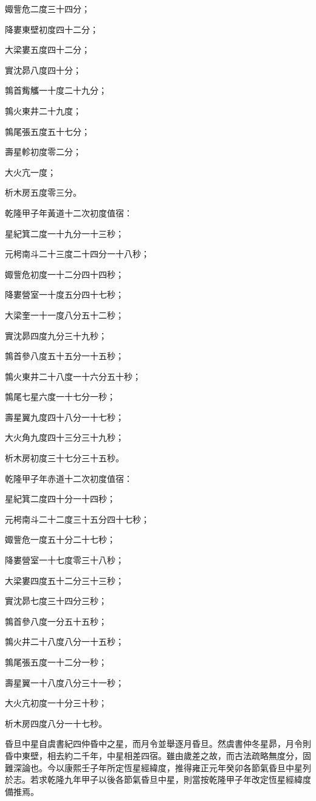 \begin{pinyinscope}
娵訾危二度三十四分；

降婁東壁初度四十二分；

大梁婁五度四十二分；

實沈昴八度四十分；

鶉首觜觿一十度二十九分；

鶉火東井二十九度；

鶉尾張五度五十七分；

壽星軫初度零二分；

大火亢一度；

析木房五度零三分。

乾隆甲子年黃道十二次初度值宿：

星紀箕二度一十九分一十三秒；

元枵南斗二十三度二十四分一十八秒；

娵訾危初度一十二分四十四秒；

降婁營室一十度五分四十七秒；

大梁奎一十一度八分五十二秒；

實沈昴四度九分三十九秒；

鶉首參八度五十五分一十五秒；

鶉火東井二十八度一十六分五十秒；

鶉尾七星六度一十七分一秒；

壽星翼九度四十八分一十七秒；

大火角九度四十三分三十九秒；

析木房初度三十七分三十五秒。

乾隆甲子年赤道十二次初度值宿：

星紀箕二度四十分一十四秒；

元枵南斗二十二度三十五分四十七秒；

娵訾危一度五十分二十七秒；

降婁營室一十七度零三十八秒；

大梁婁四度五十二分三十三秒；

實沈昴七度三十四分三秒；

鶉首參八度一分五十五秒；

鶉火井二十八度八分一十五秒；

鶉尾張五度一十二分一秒；

壽星翼一十八度八分三十一秒；

大火亢初度一十分三十秒；

析木房四度八分一十七秒。

昏旦中星自虞書紀四仲昏中之星，而月令並舉逐月昏旦。然虞書仲冬星昴，月令則昏中東壁，相去約二千年，中星相差四宿。雖由歲差之故，而古法疏略無度分，固難深論也。今以康熙壬子年所定恆星經緯度，推得雍正元年癸卯各節氣昏旦中星列於志。若求乾隆九年甲子以後各節氣昏旦中星，則當按乾隆甲子年改定恆星經緯度備推焉。


\end{pinyinscope}
